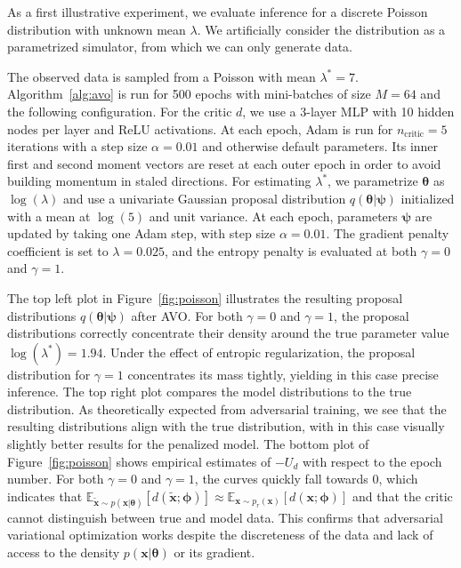 \documentclass{article}
\newcommand{\bftheta}{{\bm \theta}}
\newcommand{\bfpsi}{{\bm \psi}}
\newcommand{\bfphi}{{\bm \phi}}
\newcommand{\bfx}{\mathbf{x}}
\theoremstyle{plain}
\begin{document}
As a first illustrative experiment, we evaluate inference for a discrete Poisson
distribution with unknown mean $\lambda$. We artificially consider
the distribution as a parametrized simulator, from which we can only
generate data.

The observed data is sampled from a Poisson with mean $\lambda^* = 7$.
Algorithm~\ref{alg:avo} is run for 500 epochs with mini-batches of size $M=64$
and the following configuration. For the critic $d$, we use a 3-layer MLP with 10
hidden nodes per layer and ReLU activations. At each epoch, Adam is run for
$n_\text{critic}=5$ iterations with a step size $\alpha=0.01$ and otherwise default parameters.
Its inner first and second moment vectors are reset at
each outer epoch in order to avoid building momentum in staled directions.  For
estimating $\lambda^*$, we parametrize $\bftheta$ as $\log(\lambda)$ and use a univariate Gaussian proposal distribution
$q(\bftheta|\bfpsi)$ initialized with a mean at $\log(5)$ and unit variance. At
each epoch, parameters $\bfpsi$ are updated by taking one Adam step, with step size
$\alpha=0.01$. The gradient penalty coefficient is set to
$\lambda=0.025$, and the entropy penalty is evaluated at both $\gamma=0$ and $\gamma=1$.

The top left plot in Figure~\ref{fig:poisson} illustrates the resulting proposal
distributions $q(\bftheta|\bfpsi)$ after AVO.  For
both $\gamma=0$ and $\gamma=1$, the proposal distributions correctly concentrate
their density around the true parameter value $\log(\lambda^*) = 1.94$. Under
the effect of entropic regularization,
the proposal distribution for $\gamma=1$ concentrates its mass tightly,
yielding in this case precise inference.  The top right plot compares the
model distributions to the true distribution.  As theoretically expected from
adversarial training, we see that the resulting distributions align with
the true distribution, with in this case visually slightly better results for the penalized
model.  The bottom plot of Figure~\ref{fig:poisson} shows empirical estimates
of $-U_d$ with respect to the epoch number. For both $\gamma=0$ and $\gamma=1$,
the curves quickly fall towards $0$, which indicates that
$\mathbb{E}_{\tilde{\mathbf{x}} \sim p(\mathbf{x}|\bftheta)}
[d(\tilde{\mathbf{x}};\bfphi)] \approx \mathbb{E}_{\mathbf{x} \sim
p_r(\mathbf{x})} [d(\mathbf{x};\bfphi)]$ and that the critic cannot distinguish
between true and model data. This confirms that adversarial variational optimization
works despite the discreteness of the data and lack of access to the
density $p(\bfx | \bftheta)$ or its gradient.
\end{document}
